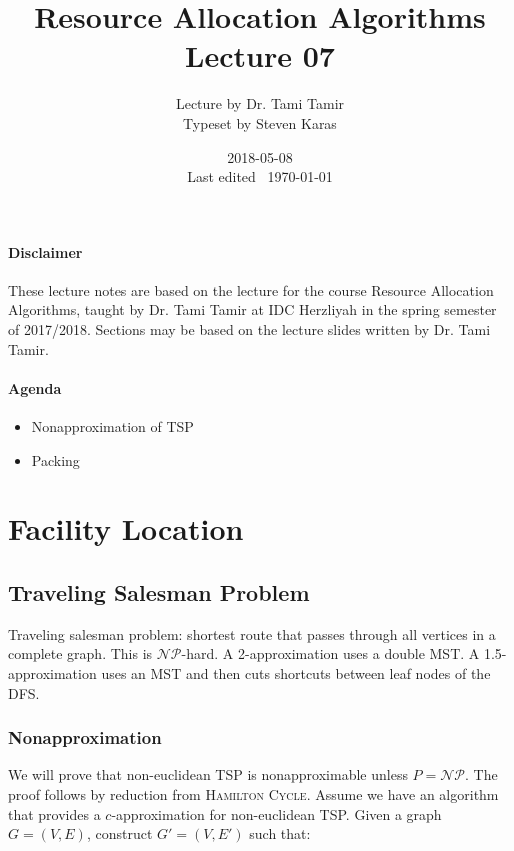 \documentclass{idc_msc}
\title{Resource Allocation Algorithms\\\large Lecture 07}
\date{2018-05-08 \\ Last edited \currenttime\ \today}
\author{Lecture by Dr. Tami Tamir\\Typeset by Steven Karas}
\newcommand{\NPclass}{\mathcal{NP}}
\begin{document}
\maketitle

\nocite{pinedo2016scheduling}

\paragraph{Disclaimer}

These lecture notes are based on the lecture for the course Resource Allocation Algorithms, taught by Dr. Tami Tamir at IDC Herzliyah in the spring semester of 2017/2018.
Sections may be based on the lecture slides written by Dr. Tami Tamir.

\paragraph{Agenda}

\begin{itemize}
  \item Nonapproximation of TSP
  \item Packing
\end{itemize}

\section{Facility Location}

\subsection{Traveling Salesman Problem}

Traveling salesman problem: shortest route that passes through all vertices in a complete graph.
This is \(\NPclass\)-hard.
A 2-approximation uses a double MST.
A 1.5-approximation uses an MST and then cuts shortcuts between leaf nodes of the DFS.

\subsubsection{Nonapproximation}

We will prove that non-euclidean TSP is nonapproximable unless \(P = \NPclass\).
The proof follows by reduction from \textsc{Hamilton Cycle}.
Assume we have an algorithm that provides a \(c\)-approximation for non-euclidean TSP.
Given a graph \(G = (V, E)\), construct \(G' = (V, E')\) such that:
\end{document}
